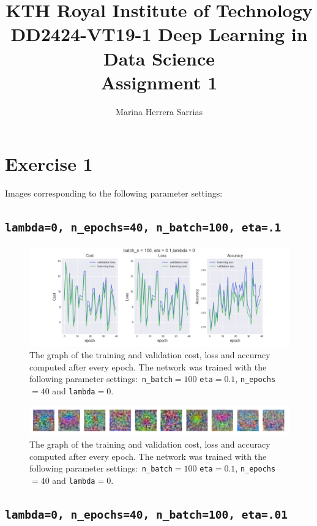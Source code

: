 \documentclass[11pt]{article}
\title{\vspace{-5.0cm}KTH Royal Institute of Technology\\ DD2424-VT19-1 Deep Learning in Data Science\\ Assignment 1 }
\author{Marina Herrera Sarrias }
\begin{document}
\maketitle

\section{Exercise 1} Images corresponding to the following parameter settings:

\subsection{\texttt{lambda=0, n\_epochs=40, n\_batch=100, eta=.1}}\label{1.1}


\begin{figure}[H]
	\centerline{\includegraphics[width=195mm,scale=0.7]{lamda_0_eta_01.png}}
	\caption{The graph of the training and validation cost, loss and accuracy computed after every epoch. The network was trained with the following parameter settings$:$ \texttt{n\_batch}$=100$ \texttt{eta}$=0.1$, \texttt{n\_epochs}$=40$ and  \texttt{lambda}$=0$.}
	\label{fig:1}
\end{figure}

\begin{figure}[H]
	\centerline{\includegraphics[width=195mm,scale=0.7]{lamda_0_eta_01_ct.png}}
	\caption{The graph of the training and validation cost, loss and accuracy computed after every epoch. The network was trained with the following parameter settings$:$ \texttt{n\_batch}$=100$ \texttt{eta}$=0.1$, \texttt{n\_epochs}$=40$ and  \texttt{lambda}$=0$.}
	\label{fig:1.1}
\end{figure}
\subsection{\texttt{lambda=0, n\_epochs=40, n\_batch=100, eta=.01}}\label{1.2}
\end{document}
